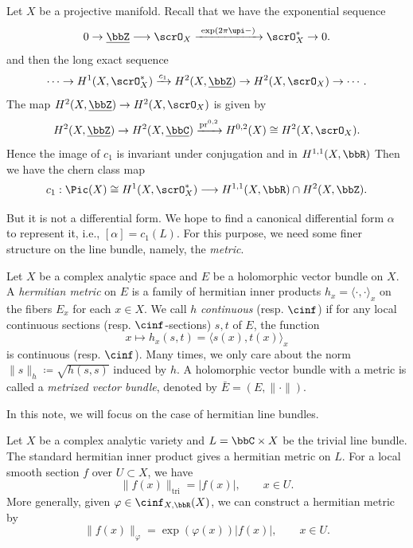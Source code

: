 Let $X$ be a projective manifold.
Recall that we have the exponential sequence
\[ 0 \to \underline{\bbZ} \longrightarrow \scrO_X \xrightarrow{\ \exp(2\pi\upi - )\ } \scrO_X^* \to 0. \]
and then the long exact sequence
\[ \cdots \to H^1(X,\scrO_X^*) \xrightarrow{c_1} H^2(X, \underline{\bbZ}) \to H^2(X,\scrO_X) \to \cdots. \]
The map $H^2(X, \underline{\bbZ}) \to H^2(X,\scrO_X)$ is given by
\[ H^2(X,\underline{\bbZ}) \to H^2(X,\underline{\bbC}) \xrightarrow{\operatorname{pr}^{0,2}} H^{0,2}(X) \cong H^2(X,\scrO_X). \]
Hence the image of $c_1$ is invariant under conjugation and in $H^{1,1}(X,\bbR)$
Then we have the chern class map
\[ c_1: \Pic(X) \cong H^1(X,\scrO_X^*) \longrightarrow H^{1,1}(X,\bbR) \cap H^2(X,\bbZ). \]

But it is not a differential form.
We hope to find a canonical differential form $\alpha$ to represent it, i.e., $[\alpha] = c_1(L)$.
For this purpose, we need some finer structure on the line bundle, namely, the \emph{metric}.

\begin{definition}[label=\labelNFM{def:hermitian-line-bundles}, status=draft, tag=0000000]
	Let $X$ be a complex analytic space and $E$ be a holomorphic vector bundle on $X$.
	A \emph{hermitian metric} on $E$ is a family of hermitian inner products \(h_x = \langle \cdot, \cdot \rangle_x\) on the fibers \(E_x\) for each \(x \in X\).
	We call $h$ \emph{continuous} (resp. \emph{$\cinf$}) if for any local continuous sections (resp. $\cinf$-sections) \(s,t\) of \(E\), the function
	\[
		x \mapsto h_x(s,t) = \langle s(x), t(x) \rangle_x
	\]
	is continuous (resp. $\cinf$).
	Many times, we only care about the norm $\|s\|_h \coloneqq \sqrt{h(s,s)}$ induced by $h$.
	A holomorphic vector bundle with a metric is called a \emph{metrized vector bundle}, denoted by $\bar{E} = (E,\|\cdot\|)$.
\end{definition}

In this note, we will focus on the case of hermitian line bundles.

\begin{example}[label=\labelNFM{eg:hermitian-metric-on-trivial-bundle}, status=draft, tag=0000000]
	Let $X$ be a complex analytic variety and $L = \bbC \times X$ be the trivial line bundle.
	The standard hermitian inner product gives a  hermitian metric on $L$.
	For a local smooth section $f$ over $U \subset X$, we have
  \[ \|f(x)\|_{\mathrm{tri}} = |f(x)|, \qquad x \in U. \]
	More generally, given $\varphi \in \cinf_{X,\bbR}(X)$, we can construct a hermitian metric by
  \[ \|f(x)\|_{\varphi} = \exp(\varphi(x))|f(x)|, \qquad x \in U. \]
\end{example}

